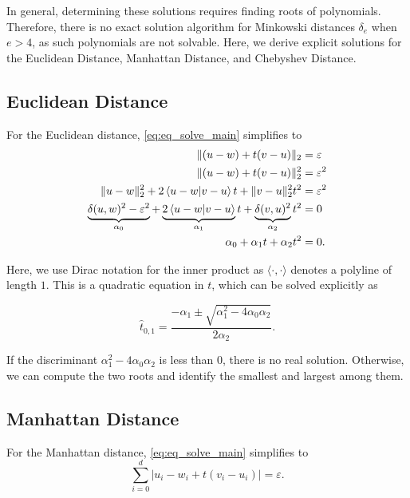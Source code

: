 In general, determining these solutions requires finding roots of polynomials. Therefore, there is no exact solution algorithm for Minkowski distances \(\delta_e\) when \(e > 4\), as such polynomials are not solvable. Here, we derive explicit solutions for the Euclidean Distance, Manhattan Distance, and Chebyshev Distance. 

\subsection{Euclidean Distance}
\label{subsubsec:eq_euclidean_distance}
For the Euclidean distance, \cref{eq:eq_solve_main} simplifies to 
\begin{align*}
  \| (u - w) + t(v - u) \|_2 &= \varepsilon \\
  \| (u - w) + t(v - u) \|_2^2 &= \varepsilon^2 \\
  \| u - w \|_2^2 + 2\braket{u - w | v - u} t  +  \| v - u \|_2^2 t^2 &= \varepsilon^2 \\
  \underbrace{\delta(u,w)^2 - \varepsilon^2}_{\alpha_0} + \underbrace{2\braket{u - w | v - u} }_{\alpha_1}t  +  \underbrace{\delta(v, u)^2}_{\alpha_2} t^2 &= 0 \\
  \alpha_0 + \alpha_1 t  + \alpha_2 t^2 &= 0.
\end{align*}

Here, we use Dirac notation for the inner product as \(\langle \cdot , \cdot \rangle\) denotes a polyline of length \(1\).
This is a quadratic equation in \(t\), which can be solved explicitly as 

\begin{equation}
  \hat t_{0,1} = \frac{-\alpha_1 \pm \sqrt{\alpha_1^2 - 4\alpha_0\alpha_2}}{2\alpha_2}.\label{eq:sol_explicit_euclidean}
\end{equation}

If the discriminant \(\alpha_1^2 - 4\alpha_0\alpha_2\) is less than \(0\), there is no real solution. Otherwise, we can compute the two roots and identify the smallest and largest among them. 


\subsection{Manhattan Distance}
\label{subsubsec:eq_manhattan_distance}
For the Manhattan distance, \cref{eq:eq_solve_main} simplifies to 
\begin{equation}
  \sum_{i=0}^d |u_i - w_i + t (v_i - u_i)| = \varepsilon. \label{eq:solve_manhattan}
\end{equation}

